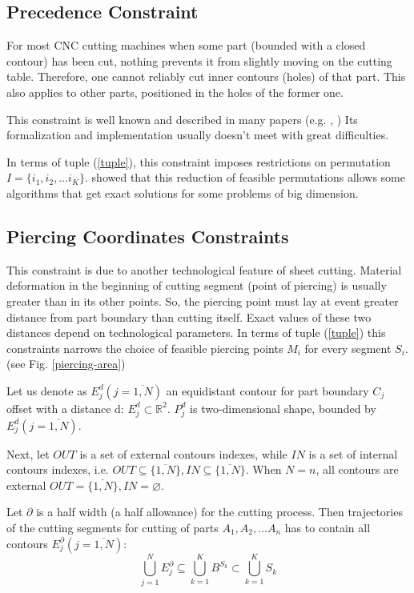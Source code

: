 \documentclass{../download/tPRS2e}
\begin{document}
\subsection{Precedence Constraint}

For most CNC cutting machines when some part (bounded with a closed contour) has been cut,
nothing prevents it from slightly moving on the cutting table.
Therefore, one cannot reliably cut inner contours (holes) of that part.
This also applies to other parts, positioned in the holes of the former one.

This constraint is well known and described in many papers
(e.g. \cite{verkhoturov_mathematical_2008}, 
\cite{dewil_cutting_2011})
Its formalization and implementation usually doesn’t meet with great difficulties.

In terms of tuple (\ref{tuple}),
this constraint imposes restrictions on permutation 
$I = \{i_1, i_2, \dots i_K\}$.
\cite{petunin_2014}
showed that this reduction of feasible permutations allows some algorithms that get exact solutions for some problems of big dimension.

\subsection{Piercing Coordinates Constraints}

This constraint is due to another technological feature of sheet cutting.
Material deformation in the beginning of cutting segment (point of piercing) is usually greater than in its other points.
So, the piercing point must lay at event greater distance from part boundary than cutting itself.
Exact values of these two distances depend on technological parameters.
In terms of tuple (\ref{tuple}) this constraints narrows the choice of feasible piercing points $M_i$
for every segment $S_i$. (see Fig. \ref{piercing-area})

Let us denote as $E^d_j (j = \overline{1, N})$
an equidistant contour for part boundary $C_j$
offset with a distance d:
$E^d_j \subset \mathbb{R}^2$.
$P^d_j$ is two-dimensional shape, bounded by $E^d_j (j=\overline{1, N})$.

Next, let $OUT$ is a set of external contours indexes,
while $IN$ is a set of internal contours indexes,
i.e. $OUT \subseteq \{\overline{1, N}\},  IN \subseteq \{\overline{1, N}\}$.
When $N = n$, all contours are external $OUT=\{\overline{1, N}\}, IN = \varnothing$.

Let $\partial$  is a half width (a half allowance) for the cutting process.
Then trajectories of the cutting segments for cutting of parts $A_1, A_2, \dots A_n$ has to contain all contours  $E^\partial_j (j = \overline{1, N})$:
$$
\bigcup^N_{j=1} E^\partial_j
\subseteq
\bigcup^K_{k=1} B^{S_k}
\subset
\bigcup^K_{k=1} S_k
$$
\end{document}
